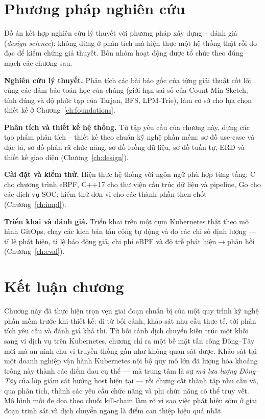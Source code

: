\section{Phương pháp nghiên cứu}

Đồ án kết hợp nghiên cứu lý thuyết với phương pháp xây dựng -- đánh giá
(\textit{design science}): không dừng ở phân tích mà hiện thực một hệ thống thật rồi đo đạc
để kiểm chứng giả thuyết. Bốn nhóm hoạt động được tổ chức theo đúng mạch các chương sau.

\textbf{Nghiên cứu lý thuyết.} Phân tích các bài báo gốc của từng giải thuật cốt lõi cùng
các đảm bảo toán học của chúng (giới hạn sai số của Count-Min Sketch, tính đúng và độ phức
tạp của Tarjan, BFS, LPM-Trie), làm cơ sở cho lựa chọn thiết kế ở Chương~\ref{ch:foundations}.

\textbf{Phân tích và thiết kế hệ thống.} Từ tập yêu cầu của chương này, dựng các tạo phẩm
phân tích -- thiết kế theo chuẩn kỹ nghệ phần mềm: sơ đồ use-case và đặc tả, sơ đồ phân rã
chức năng, sơ đồ luồng dữ liệu, sơ đồ tuần tự, ERD và thiết kế giao diện
(Chương~\ref{ch:design}).

\textbf{Cài đặt và kiểm thử.} Hiện thực hệ thống với ngôn ngữ phù hợp từng tầng: C cho
chương trình eBPF, C++17 cho thư viện cấu trúc dữ liệu và pipeline, Go cho các dịch vụ SOC;
kiểm thử đơn vị cho các thành phần then chốt (Chương~\ref{ch:impl}).

\textbf{Triển khai và đánh giá.} Triển khai trên một cụm Kubernetes thật theo mô hình
GitOps, chạy các kịch bản tấn công tự động và đo các chỉ số định lượng --- tỉ lệ phát hiện,
tỉ lệ báo động giả, chi phí eBPF và độ trễ phát hiện$\rightarrow$phản hồi
(Chương~\ref{ch:eval}).

\section{Kết luận chương}

Chương này đã thực hiện trọn vẹn giai đoạn chuẩn bị của một quy trình kỹ nghệ phần mềm
trước khi thiết kế: đi từ bối cảnh, khảo sát nhu cầu thực tế, tới phân tích yêu cầu và
đánh giá khả thi. Từ bối cảnh dịch chuyển kiến trúc một khối sang vi dịch vụ trên
Kubernetes, chương chỉ ra một bề mặt tấn công Đông--Tây mới mà an ninh chu vi truyền thống
gần như không quan sát được. Khảo sát tại một doanh nghiệp vận hành Kubernetes nội bộ quy
mô lớn đã lượng hóa khoảng trống này thành các điểm đau cụ thể --- mà trung tâm là sự
\emph{mù lưu lượng Đông--Tây} của lớp giám sát hướng host hiện tại --- rồi chưng cất thành
tập nhu cầu và, qua phân tích, thành các yêu cầu chức năng và phi chức năng có thể truy
vết. Mô hình mối đe dọa theo chuỗi kill-chain làm rõ vì sao việc phát hiện sớm ở giai đoạn
trinh sát và dịch chuyển ngang là điểm can thiệp hiệu quả nhất.

